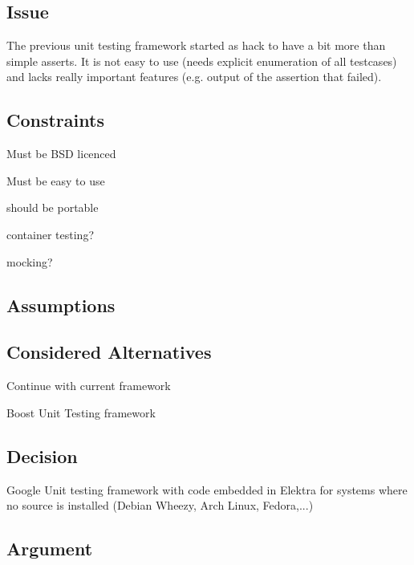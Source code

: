 \subsection*{Issue}

The previous unit testing framework started as hack to have a bit more than simple asserts. It is not easy to use (needs explicit enumeration of all testcases) and lacks really important features (e.\+g. output of the assertion that failed).

\subsection*{Constraints}


\begin{DoxyItemize}
\item Must be B\+SD licenced
\item Must be easy to use
\item should be portable
\item container testing?
\item mocking?
\end{DoxyItemize}

\subsection*{Assumptions}

\subsection*{Considered Alternatives}


\begin{DoxyItemize}
\item Continue with current framework
\item Boost Unit Testing framework
\end{DoxyItemize}

\subsection*{Decision}


\begin{DoxyItemize}
\item Google Unit testing framework with code embedded in Elektra for systems where no source is installed (Debian Wheezy, Arch Linux, Fedora,...)
\end{DoxyItemize}

\subsection*{Argument}


